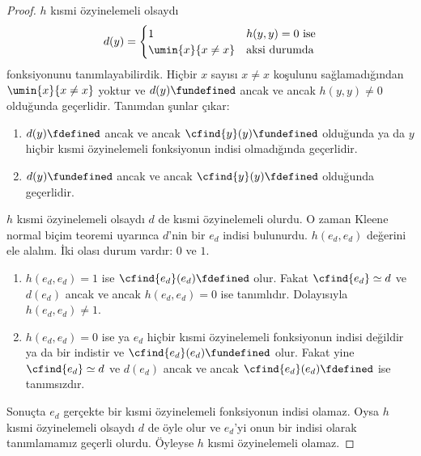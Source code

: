 \documentclass[../../../include/open-logic-section]{subfiles}
\begin{document}
\begin{proof}
$h$ kısmi özyinelemeli olsaydı
\[
  d(y)=\begin{cases}
    1 & \text{$h(y,y)=0$ ise}\\
    \umin{x}{x\neq x} & \text{aksi durumda}
  \end{cases}
\]
fonksiyonunu tanımlayabilirdik. Hiçbir $x$ sayısı $x\neq x$ koşulunu
sağlamadığından $\umin{x}{x\neq x}$ yoktur ve
$d(y)\fundefined$ ancak ve ancak $h(y,y)\neq0$ olduğunda geçerlidir.
Tanımdan şunlar çıkar:
\begin{enumerate}
\item $d(y)\fdefined$ ancak ve ancak $\cfind{y}(y)\fundefined$ olduğunda ya
  da $y$ hiçbir kısmi özyinelemeli fonksiyonun indisi olmadığında geçerlidir.
\item $d(y)\fundefined$ ancak ve ancak $\cfind{y}(y)\fdefined$ olduğunda
  geçerlidir.
\end{enumerate}
$h$ kısmi özyinelemeli olsaydı $d$ de kısmi özyinelemeli olurdu. O zaman
Kleene normal biçim teoremi uyarınca $d$'nin bir $e_d$ indisi bulunurdu.
$h(e_d,e_d)$ değerini ele alalım. İki olası durum vardır: $0$ ve $1$.
\begin{enumerate}
\item $h(e_d,e_d)=1$ ise $\cfind{e_d}(e_d)\fdefined$ olur. Fakat
  $\cfind{e_d}\simeq d$ ve $d(e_d)$ ancak ve ancak $h(e_d,e_d)=0$ ise
  tanımlıdır. Dolayısıyla $h(e_d,e_d)\neq1$.
\item $h(e_d,e_d)=0$ ise ya $e_d$ hiçbir kısmi özyinelemeli fonksiyonun
  indisi değildir ya da bir indistir ve $\cfind{e_d}(e_d)\fundefined$ olur.
  Fakat yine $\cfind{e_d}\simeq d$ ve $d(e_d)$ ancak ve ancak
  $\cfind{e_d}(e_d)\fdefined$ ise tanımsızdır.
\end{enumerate}
Sonuçta $e_d$ gerçekte bir kısmi özyinelemeli fonksiyonun indisi olamaz.
Oysa $h$ kısmi özyinelemeli olsaydı $d$ de öyle olur ve $e_d$'yi onun bir
indisi olarak tanımlamamız geçerli olurdu. Öyleyse $h$ kısmi özyinelemeli
olamaz.
\end{proof}
\end{document}
